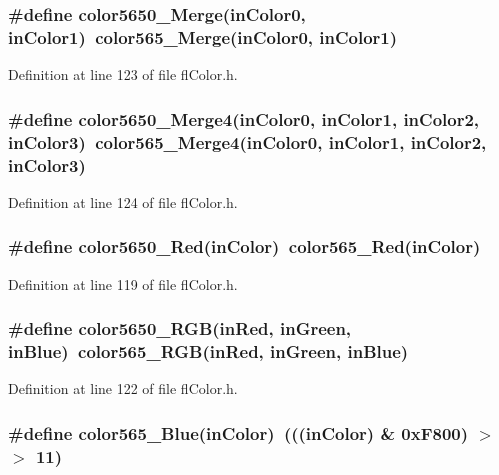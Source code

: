 \subsubsection{\setlength{\rightskip}{0pt plus 5cm}\#define color5650\_\-Merge(in\-Color0, in\-Color1)~color565\_\-Merge(in\-Color0, in\-Color1)}\label{flColor_8h_0061c718cf02a31ddfdfc7ba4967c55a}




Definition at line 123 of file fl\-Color.h.
\subsubsection{\setlength{\rightskip}{0pt plus 5cm}\#define color5650\_\-Merge4(in\-Color0, in\-Color1, in\-Color2, in\-Color3)~color565\_\-Merge4(in\-Color0, in\-Color1, in\-Color2, in\-Color3)}\label{flColor_8h_2906def7798a09863aa451d739965ed5}




Definition at line 124 of file fl\-Color.h.
\subsubsection{\setlength{\rightskip}{0pt plus 5cm}\#define color5650\_\-Red(in\-Color)~color565\_\-Red(in\-Color)}\label{flColor_8h_d9d22c0b1171d2251b5524a345352210}




Definition at line 119 of file fl\-Color.h.
\subsubsection{\setlength{\rightskip}{0pt plus 5cm}\#define color5650\_\-RGB(in\-Red, in\-Green, in\-Blue)~color565\_\-RGB(in\-Red, in\-Green, in\-Blue)}\label{flColor_8h_1f6be18c4166b38f7995ddf0314b037a}




Definition at line 122 of file fl\-Color.h.
\subsubsection{\setlength{\rightskip}{0pt plus 5cm}\#define color565\_\-Blue(in\-Color)~(((in\-Color) \& 0x\-F800) $>$$>$ 11)}\label{flColor_8h_0d04c95d20db2536d979fa8512fad717}




